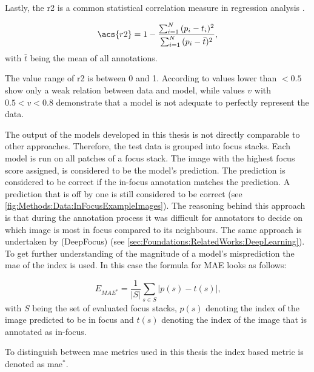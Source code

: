 Lastly, the \ac{r2} is a common statistical correlation measure in regression analysis \cite{dibucchianico2008coefficient}.

\begin{equation} \acs{r2} = 1 - \frac{\sum_{i=1}^{N}{(p_i - t_i)^2}}{\sum_{i=1}^{N}{(p_i - \bar{t})^2}} \text{,} \end{equation} with $\bar{t}$ being the mean of all annotations.

The value range of \acs{r2} is between 0 and 1. According to \textcite{dibucchianico2008coefficient} values lower than $<0.5$ show only a weak relation between data and model, while values $v$ with $0.5 < v < 0.8$ demonstrate that a model is not adequate to perfectly represent the data.


The output of the models developed in this thesis is not directly comparable to other approaches. Therefore, the test data is grouped into focus stacks. Each model is run on all patches of a focus stack. The image with the highest focus score assigned, is considered to be the model's prediction. The prediction is considered to be correct if the in-focus annotation matches the prediction. A prediction that is off by one is still considered to be correct (see \autoref{fig:Methods:Data:InFocusExampleImages}).
The reasoning behind this approach is that during the annotation process it was difficult for annotators to decide on which image is most in focus compared to its neighbours. The same approach is undertaken by \citeauthor{senaras2018deepfocus} (DeepFocus) \cite{senaras2018deepfocus} (see \autoref{sec:Foundations:RelatedWorks:DeepLearning}). To get further understanding of the magnitude of a model's misprediction the \ac{mae} of the index is used. In this case the formula for MAE looks as follows:

\begin{equation} E_{MAE^*} = \frac{1}{|S|}\sum_{s \in S} |p(s) - t(s)| \text{,} \end{equation} with $S$ being the set of evaluated focus stacks, $p(s)$ denoting the index of the image predicted to be in focus and $t(s)$ denoting the index of the image that is annotated as in-focus.

To distinguish between \ac{mae} metrics used in this thesis the index based metric is denoted as \ac{mae}$^*$.


